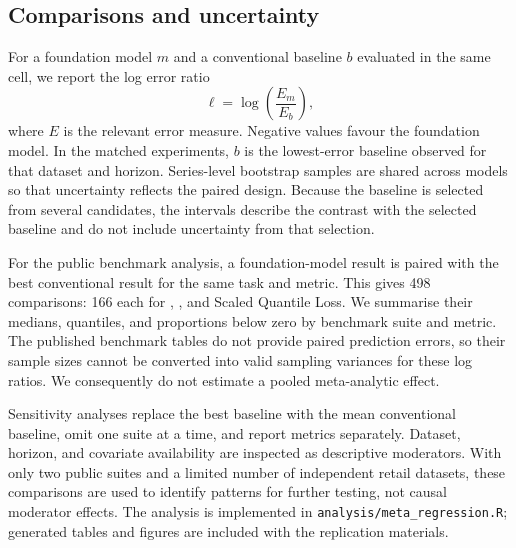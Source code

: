 \subsection{Comparisons and uncertainty}
\label{subsec:metaspec}

For a foundation model $m$ and a conventional baseline $b$ evaluated in the
same cell, we report the log error ratio
\begin{equation}
  \ell=\log\left(\frac{E_m}{E_b}\right),
\end{equation}
where $E$ is the relevant error measure. Negative values favour the foundation
model. In the matched experiments, $b$ is the lowest-error baseline observed
for that dataset and horizon. Series-level bootstrap samples are shared across
models so that uncertainty reflects the paired design. Because the baseline is
selected from several candidates, the intervals describe the contrast with
the selected baseline and do not include uncertainty from that selection.

For the public benchmark analysis, a foundation-model result is paired with
the best conventional result for the same task and metric. This gives 498
comparisons: 166 each for \WAPE{}, \MASE{}, and Scaled Quantile Loss. We
summarise their medians, quantiles, and proportions below zero by benchmark
suite and metric. The published benchmark tables do not provide paired
prediction errors, so their sample sizes cannot be converted into valid
sampling variances for these log ratios. We consequently do not estimate a
pooled meta-analytic effect.

Sensitivity analyses replace the best baseline with the mean conventional
baseline, omit one suite at a time, and report metrics separately. Dataset,
horizon, and covariate availability are inspected as descriptive moderators.
With only two public suites and a limited number of independent retail
datasets, these comparisons are used to identify patterns for further testing,
not causal moderator effects. The analysis is implemented in
\texttt{analysis/meta\_regression.R}; generated tables and figures are included
with the replication materials.
